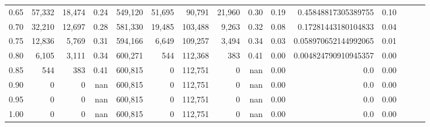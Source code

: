 \begin{tabular}{rrrrrrrrrrrrrrr}
0.65 &  57,332 &  18,474 &  0.24 &  549,120 &   51,695 &   90,791 &   21,960 &  0.30 &  0.19 &   0.45848817305389755 &      0.10 \\
0.70 &  32,210 &  12,697 &  0.28 &  581,330 &   19,485 &  103,488 &    9,263 &  0.32 &  0.08 &   0.17281443180104833 &      0.04 \\
0.75 &  12,836 &   5,769 &  0.31 &  594,166 &    6,649 &  109,257 &    3,494 &  0.34 &  0.03 &  0.058970652144992065 &      0.01 \\
0.80 &   6,105 &   3,111 &  0.34 &  600,271 &      544 &  112,368 &      383 &  0.41 &  0.00 &  0.004824790910945357 &      0.00 \\
0.85 &     544 &     383 &  0.41 &  600,815 &        0 &  112,751 &        0 &   nan &  0.00 &                   0.0 &      0.00 \\
0.90 &       0 &       0 &   nan &  600,815 &        0 &  112,751 &        0 &   nan &  0.00 &                   0.0 &      0.00 \\
0.95 &       0 &       0 &   nan &  600,815 &        0 &  112,751 &        0 &   nan &  0.00 &                   0.0 &      0.00 \\
1.00 &       0 &       0 &   nan &  600,815 &        0 &  112,751 &        0 &   nan &  0.00 &                   0.0 &      0.00 \\
\bottomrule
\end{tabular}
